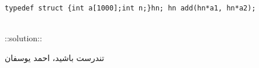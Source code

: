 \documentclass[12pt, a4paper]{article}
\begin{document}
\begin{enumerate}
\begin{latin}
\begin{lstlisting}[numbers=none] 
typedef struct {int a[1000];int n;}hn; hn add(hn*a1, hn*a2);
\end{lstlisting}
\end{latin}

\begin{latin}
\\
::solution:: \\

\end{latin}

\end{enumerate}
تندرست باشید، احمد یوسفان
\end{document}
